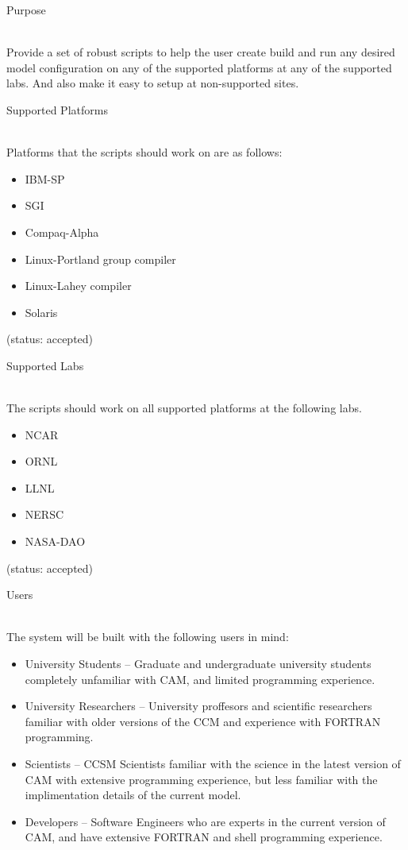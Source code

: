 \documentclass[]{article}
\begin{document}
\begin{enumerate}

{\bf\em \item Purpose} \\
Provide a set of robust scripts to help the user create build and run any desired model
configuration on any of the supported platforms at any of the supported labs. And also
make it easy to setup at non-supported sites.

{\bf\em \item Supported Platforms}\\
Platforms that the scripts should work on are as follows:\\
\begin{itemize}
  \item IBM-SP
  \item SGI
  \item Compaq-Alpha
  \item Linux-Portland group compiler
  \item Linux-Lahey compiler
  \item Solaris
\end{itemize}
(status: accepted)

{\bf\em \item Supported Labs}\\
The scripts should work on all supported platforms at the following labs.\\
\begin{itemize}
  \item NCAR

  \item ORNL

  \item LLNL

  \item NERSC

  \item NASA-DAO
\end{itemize}

(status: accepted)

{\bf\em \item Users}\\
The system will be built with the following users in mind:
\begin{itemize}
\item University Students -- Graduate and undergraduate university students
	completely unfamiliar with CAM, and limited programming experience.
\item University Researchers -- University proffesors and scientific researchers
	familiar with older versions of the CCM and experience with FORTRAN programming.
\item Scientists -- CCSM Scientists familiar with the science in the latest version of CAM
	with extensive programming experience, but less familiar with the implimentation
	details of the current model.
\item Developers -- Software Engineers who are experts in the current version of CAM, 
       and have extensive FORTRAN and shell programming experience.


\end{itemize}
\end{enumerate}
\end{document}
